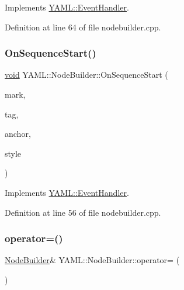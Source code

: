 Implements \mbox{\hyperlink{class_y_a_m_l_1_1_event_handler_a8b36cc36cd7067175b80b5d047aafaf3}{Y\+A\+M\+L\+::\+Event\+Handler}}.



Definition at line 64 of file nodebuilder.\+cpp.

\mbox{\label{class_y_a_m_l_1_1_node_builder_aa69f5009a6cc939b063c1041be30ceb7}} 
\subsubsection{\texorpdfstring{OnSequenceStart()}{OnSequenceStart()}}
{\footnotesize\ttfamily \mbox{\hyperlink{glad_8h_a950fc91edb4504f62f1c577bf4727c29}{void}} Y\+A\+M\+L\+::\+Node\+Builder\+::\+On\+Sequence\+Start (\begin{DoxyParamCaption}\item[{const \mbox{\hyperlink{struct_y_a_m_l_1_1_mark}{Mark}} \&}]{mark,  }\item[{const \mbox{\hyperlink{glad_8h_ac83513893df92266f79a515488701770}{std\+::string}} \&}]{tag,  }\item[{\mbox{\hyperlink{namespace_y_a_m_l_abeff1798814ae3402fc5665fdcad1de6}{anchor\+\_\+t}}}]{anchor,  }\item[{\mbox{\hyperlink{struct_y_a_m_l_1_1_emitter_style_ae86640662c85ce6062a37f9636b6959f}{Emitter\+Style\+::value}}}]{style }\end{DoxyParamCaption})\hspace{0.3cm}{\ttfamily [virtual]}}



Implements \mbox{\hyperlink{class_y_a_m_l_1_1_event_handler_adf7a5e4ccf638b656009525556412ab5}{Y\+A\+M\+L\+::\+Event\+Handler}}.



Definition at line 56 of file nodebuilder.\+cpp.

\mbox{\label{class_y_a_m_l_1_1_node_builder_a56c9a3ed0f3e0fd3049e9b124a2185cb}} 
\subsubsection{\texorpdfstring{operator=()}{operator=()}\hspace{0.1cm}{\footnotesize\ttfamily [1/2]}}
{\footnotesize\ttfamily \mbox{\hyperlink{class_y_a_m_l_1_1_node_builder}{Node\+Builder}}\& Y\+A\+M\+L\+::\+Node\+Builder\+::operator= (\begin{DoxyParamCaption}\item[{const \mbox{\hyperlink{class_y_a_m_l_1_1_node_builder}{Node\+Builder}} \&}]{ }\end{DoxyParamCaption})\hspace{0.3cm}{\ttfamily [delete]}}

